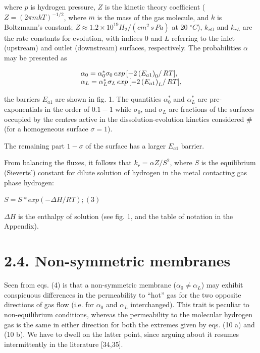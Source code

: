 \documentclass[11pt]{article}
\begin{document}
    where \(p\) is hydrogen pressure, \(Z\) is the kinetic theory
coefficient (\(Z = (2 \pi m k T)^{-1/2}\), where \(m\) is the mass of
the gas molecule, and \(k\) is Boltzmann's constant;
\(Z \approx 1.2 \times 10^{19} H_2 \big /(cm^2 \, s \, Pa)\) at 20
\(^{\circ}C\)), \(k_{rO}\) and \(k_{rL}\) are the rate constants for
evolution, with indices \(0\) and \(L\) referring to the inlet
(upstream) and outlet (downstream) surfaces, respectively. The
probabilities \(\alpha\) may be presented as

\begin{equation}
\begin{array}{l}
\alpha_0 = \alpha_{0}^{*}  \sigma_0 \, exp\left[ -2 \left(E_{a1}\right)_0 \right / RT], \\
\alpha_L = \alpha_{L}^{*} \sigma_L \, exp\left[ -2 \left(E_{a1}\right)_L\right / RT], \\
\end{array}
\end{equation}

    the barriers \(E_{a1}\) are shown in fig. 1. The quantities
\(\alpha_{0}^{*}\) and \(\alpha_{L}^{*}\) are pre-exponentials in the
order of \(0.1-1\) while \(\sigma_0\), and \(\sigma_L\) are fractions of
the surfaces occupied by the centres active in the dissolution-evolution
kinetics considered \# (for a homogeneous surface \(\sigma = 1\)).

The remaining part \(1 - \sigma\) of the surface has a larger \(E_{a1}\)
barrier.

    From balancing the fluxes, it follows that \(k_r = \alpha Z / S^2\),
where \(S\) is the equilibrium (Sieverts') constant for dilute solution
of hydrogen in the metal contacting gas phase hydrogen:

\(S=S* exp(-\Delta H/RT);(3)\)

\(\Delta H\) is the enthalpy of solution (see fig. 1, and the table of
notation in the Appendix).

    \section{2.4. Non-symmetric membranes}\label{non-symmetric-membranes}

Seen from eqs. (4) is that a non-symmetric membrane
(\(\alpha_0 \neq \alpha_L\)) may exhibit conspicuous differences in the
permeability to ``hot'' gas for the two opposite directions of gas flow
(i.e. for \(\alpha_0\) and \(\alpha_L\) interchanged). This trait is
peculiar to non-equilibrium conditions, whereas the permeability to the
molecular hydrogen gas is the same in either direction for both the
extremes given by eqs. (10 a) and (10 b). We have to dwell on the latter
point, since arguing about it resumes intermittently in the literature
{[}34,35{]}.
\end{document}
